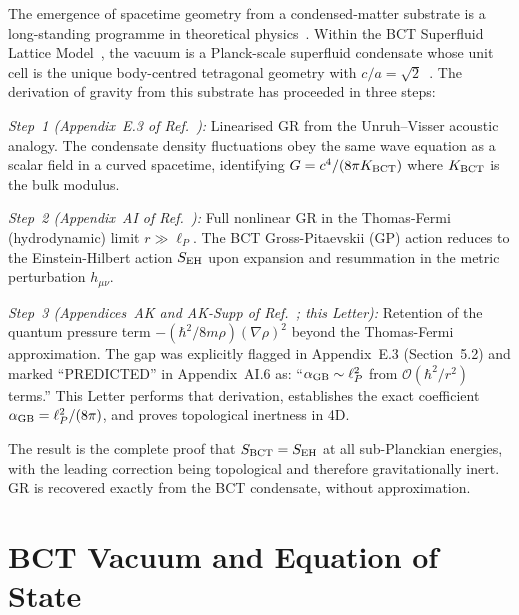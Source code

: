 \documentclass[twocolumn,10pt,a4paper]{article}
\begin{document}
The emergence of spacetime geometry from a condensed-matter substrate is a
long-standing programme in theoretical physics~\cite{unruh81,visser98}.
Within the BCT Superfluid Lattice Model~\cite{prl,monograph}, the vacuum
is a Planck-scale superfluid condensate whose unit cell is the unique
body-centred tetragonal geometry with $c/a = \sqrt{2}$~\cite{lorentz}.
The derivation of gravity from this substrate has proceeded in three
steps:

\textit{Step~1 (Appendix~E.3 of Ref.~\cite{monograph}):} Linearised GR
from the Unruh--Visser acoustic analogy. The condensate density
fluctuations obey the same wave equation as a scalar field in a curved
spacetime, identifying $G = c^4/(8\pi K_{\rm BCT})$ where $K_{\rm BCT}$
is the bulk modulus.

\textit{Step~2 (Appendix~AI of Ref.~\cite{monograph}):} Full nonlinear GR
in the Thomas-Fermi (hydrodynamic) limit $r \gg \ell_P$. The BCT
Gross-Pitaevskii (GP) action reduces to the Einstein-Hilbert action
$S_{\rm EH}$ upon expansion and resummation in the metric perturbation
$h_{\mu\nu}$.

\textit{Step~3 (Appendices~AK and AK-Supp of Ref.~\cite{monograph}; this
Letter):} Retention of the quantum pressure term $-(\hbar^2/8m\rho)(\nabla\rho)^2$
beyond the Thomas-Fermi approximation. The gap was explicitly flagged in
Appendix~E.3 (Section~5.2) and marked ``PREDICTED'' in Appendix~AI.6 as:
``$\alpha_{\rm GB} \sim \ell_P^2$ from $\mathcal{O}(\hbar^2/r^2)$ terms.''
This Letter performs that derivation, establishes the exact coefficient
$\alpha_{\rm GB} = \ell_P^2/(8\pi)$, and proves topological inertness
in 4D.

The result is the complete proof that $S_{\rm BCT} = S_{\rm EH}$ at all
sub-Planckian energies, with the leading correction being topological and
therefore gravitationally inert. GR is recovered exactly from the BCT
condensate, without approximation.

\section*{BCT Vacuum and Equation of State}
\end{document}
